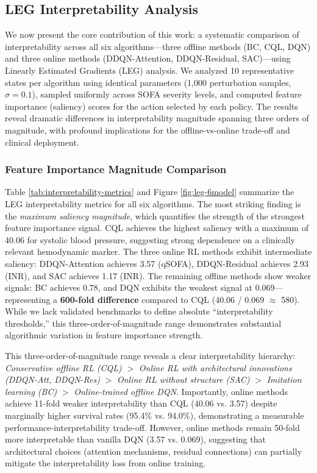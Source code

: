 \subsection{LEG Interpretability Analysis}\label{sec:results:leg}

We now present the core contribution of this work: a systematic comparison of interpretability across all six algorithms---three offline methods (BC, CQL, DQN) and three online methods (DDQN-Attention, DDQN-Residual, SAC)---using Linearly Estimated Gradients (LEG) analysis. We analyzed 10 representative states per algorithm using identical parameters (1,000 perturbation samples, $\sigma=0.1$), sampled uniformly across SOFA severity levels, and computed feature importance (saliency) scores for the action selected by each policy. The results reveal dramatic differences in interpretability magnitude spanning three orders of magnitude, with profound implications for the offline-vs-online trade-off and clinical deployment.

\subsubsection{Feature Importance Magnitude Comparison}

Table \ref{tab:interpretability-metrics} and Figure \ref{fig:leg-6model} summarize the LEG interpretability metrics for all six algorithms. The most striking finding is the \textit{maximum saliency magnitude}, which quantifies the strength of the strongest feature importance signal. CQL achieves the highest saliency with a maximum of 40.06 for systolic blood pressure, suggesting strong dependence on a clinically relevant hemodynamic marker. The three online RL methods exhibit intermediate saliency: DDQN-Attention achieves 3.57 (qSOFA), DDQN-Residual achieves 2.93 (INR), and SAC achieves 1.17 (INR). The remaining offline methods show weaker signals: BC achieves 0.78, and DQN exhibits the weakest signal at 0.069—representing a \textbf{600-fold difference} compared to CQL (40.06 / 0.069 $\approx$ 580). While we lack validated benchmarks to define absolute ``interpretability thresholds,'' this three-order-of-magnitude range demonstrates substantial algorithmic variation in feature importance strength.

This three-order-of-magnitude range reveals a clear interpretability hierarchy: \textit{Conservative offline RL (CQL)} $>$ \textit{Online RL with architectural innovations (DDQN-Att, DDQN-Res)} $>$ \textit{Online RL without structure (SAC)} $>$ \textit{Imitation learning (BC)} $>$ \textit{Online-trained offline DQN}. Importantly, online methods achieve 11-fold weaker interpretability than CQL (40.06 vs. 3.57) despite marginally higher survival rates (95.4\% vs. 94.0\%), demonstrating a measurable performance-interpretability trade-off. However, online methods remain 50-fold more interpretable than vanilla DQN (3.57 vs. 0.069), suggesting that architectural choices (attention mechanisms, residual connections) can partially mitigate the interpretability loss from online training.

